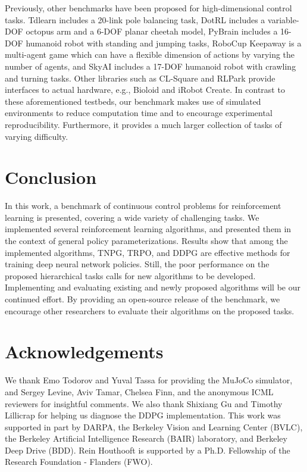 \documentclass{article}
\begin{document}
Previously, other benchmarks have been proposed for high-dimensional control tasks. Tdlearn \cite{tdlearn} includes a 20-link pole balancing task, DotRL \cite{dotRL} includes a variable-DOF octopus arm and a 6-DOF planar cheetah model, PyBrain \cite{PyBrain} includes a 16-DOF humanoid robot with standing and jumping tasks, RoboCup Keepaway \cite{stone2005keepaway} is a multi-agent game which can have a flexible dimension of actions by varying the number of agents, and SkyAI \cite{SkyAI} includes a 17-DOF humanoid robot with crawling and turning tasks. Other libraries such as CL-Square \cite{CLSquare} and RLPark \cite{RLPark}
provide interfaces to actual hardware, e.g., Bioloid and iRobot Create. In contrast to these aforementioned testbeds, our benchmark makes use of simulated environments to reduce computation time and to encourage experimental reproducibility. Furthermore, it provides a much larger collection of tasks of varying difficulty.






\section{Conclusion}
\label{section:conclusion}

In this work, a benchmark of continuous control problems for reinforcement learning is presented, covering a wide variety of challenging tasks. We implemented several reinforcement learning algorithms, and presented them in the context of general policy parameterizations. Results show that among the implemented algorithms, TNPG, TRPO, and DDPG are effective methods for training deep neural network policies. Still, the poor performance on the proposed hierarchical tasks calls for new algorithms to be developed. Implementing and evaluating existing and newly proposed algorithms will be our continued effort. By providing an open-source release of the benchmark, we encourage other researchers to evaluate their algorithms on the proposed tasks.

\section*{Acknowledgements}

We thank Emo Todorov and Yuval Tassa for providing the MuJoCo simulator, and Sergey Levine, Aviv Tamar, Chelsea Finn, and the anonymous ICML reviewers for insightful comments. We also thank Shixiang Gu and Timothy Lillicrap for helping us diagnose the DDPG implementation. This work was supported in part by DARPA, the Berkeley Vision and
Learning Center (BVLC), the Berkeley Artificial Intelligence Research
(BAIR) laboratory, and Berkeley Deep Drive (BDD). Rein Houthooft is supported by a Ph.D. Fellowship of the Research Foundation - Flanders (FWO).
\end{document}
